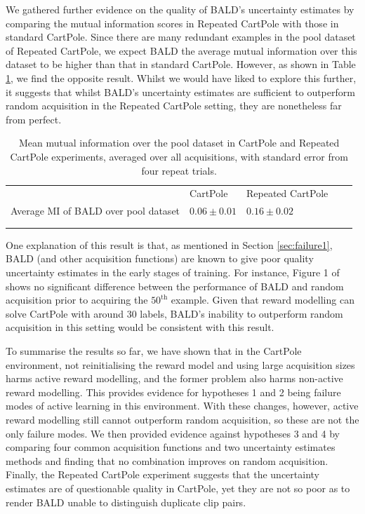 \documentclass[11pt, a4paper, bibliography=totoc]{report}
\begin{document}
We gathered further evidence on the quality of BALD's uncertainty estimates by comparing the mutual information scores in Repeated CartPole with those in standard CartPole. Since there are many redundant examples in the pool dataset of Repeated CartPole, we expect BALD the average mutual information over this dataset to be higher than that in standard CartPole. However, as shown in Table \ref{table:2}, we find the opposite result. Whilst we would have liked to explore this further, it suggests that whilst BALD's uncertainty estimates are sufficient to outperform random acquisition in the Repeated CartPole setting, they are nonetheless far from perfect.

\begin{table}[]
\begin{tabular}{lllll}
	\cline{1-3}
	\multicolumn{1}{l|}{}                                     & CartPole     & Repeated CartPole &  &  \\ \cline{1-3}
	\multicolumn{1}{l|}{Average MI of BALD over pool dataset} & $ 0.06 \pm 0.01 $ & $  0.16 \pm 0.02 $      &  &  \\ \cline{1-3}
	&              &                   &  &  \\
	&              &                   &  & 
\end{tabular}
\label{table:2}
\caption{Mean mutual information over the pool dataset in CartPole and Repeated CartPole experiments, averaged over all acquisitions, with standard error from four repeat trials.}
\end{table}

One explanation of this result is that, as mentioned in Section \ref{sec:failure1}, BALD (and other acquisition functions) are known to give poor quality uncertainty estimates in the early stages of training. For instance, Figure 1 of \cite{Gal2017b} shows no significant difference between the performance of BALD and random acquisition prior to acquiring the $ 50^\text{th} $ example. Given that reward modelling can solve CartPole with around 30 labels, BALD's inability to outperform random acquisition in this setting would be consistent with this result.

To summarise the results so far, we have shown that in the CartPole environment, not reinitialising the reward model and using large acquisition sizes harms active reward modelling, and the former problem also harms non-active reward modelling. This provides evidence for hypotheses 1 and 2 being failure modes of active learning in this environment. With these changes, however, active reward modelling still cannot outperform random acquisition, so these are not the only failure modes. We then provided evidence against hypotheses 3 and 4 by comparing four common acquisition functions and two uncertainty estimates methods and finding that no combination improves on random acquisition. Finally, the Repeated CartPole experiment suggests that the uncertainty estimates are of questionable quality in CartPole, yet they are not so poor as to render BALD unable to distinguish duplicate clip pairs.
\end{document}
